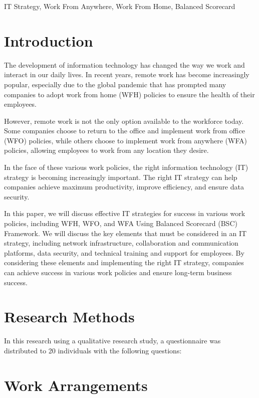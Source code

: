 \documentclass[conference]{IEEEtran}
\begin{document}
\begin{IEEEkeywords}
IT Strategy, Work From Anywhere, Work From Home, Balanced Scorecard
\end{IEEEkeywords}

\section{Introduction}
The development of information technology has changed the way we work and interact in our daily lives. In recent years, remote work has become increasingly popular, especially due to the global pandemic that has prompted many companies to adopt work from home (WFH) policies to ensure the health of their employees.

However, remote work is not the only option available to the workforce today. Some companies choose to return to the office and implement work from office (WFO) policies, while others choose to implement work from anywhere (WFA) policies, allowing employees to work from any location they desire.

In the face of these various work policies, the right information technology (IT) strategy is becoming increasingly important. The right IT strategy can help companies achieve maximum productivity, improve efficiency, and ensure data security.

In this paper, we will discuss effective IT strategies for success in various work policies, including WFH, WFO, and WFA Using Balanced Scorecard (BSC) Framework. We will discuss the key elements that must be considered in an IT strategy, including network infrastructure, collaboration and communication platforms, data security, and technical training and support for employees. By considering these elements and implementing the right IT strategy, companies can achieve success in various work policies and ensure long-term business success.

\section{Research Methods}

In this research using a qualitative research study, a questionnaire was distributed to 20 individuals with the following questions:

\section{Work Arrangements}
\end{document}
